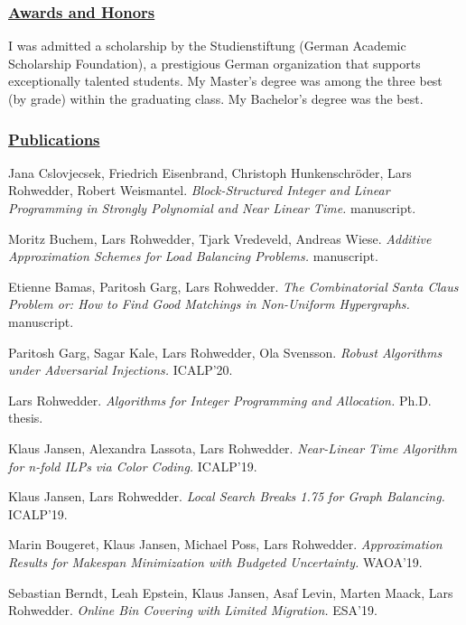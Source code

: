 \documentclass{article}
\begin{document}
  

  \subsubsection*{\underline{Awards and Honors}}
    I was admitted a scholarship by the Studienstiftung (German Academic Scholarship Foundation), a prestigious German organization that supports exceptionally talented students.
My Master's degree was among the three best (by grade) within the graduating class. My Bachelor's degree was the best.


  \subsubsection*{\underline{Publications}}
  
     \noindent
     Jana Cslovjecsek, Friedrich Eisenbrand, Christoph Hunkenschröder, Lars Rohwedder, Robert Weismantel. {\it Block-Structured Integer and Linear Programming in Strongly Polynomial and Near Linear Time.} manuscript. \medskip

  
     \noindent
     Moritz Buchem, Lars Rohwedder, Tjark Vredeveld, Andreas Wiese. {\it Additive Approximation Schemes for Load Balancing Problems.} manuscript. \medskip

  
     \noindent
     Etienne Bamas, Paritosh Garg, Lars Rohwedder. {\it The Combinatorial Santa Claus Problem or: How to Find Good Matchings in Non-Uniform Hypergraphs.} manuscript. \medskip

  
     \noindent
     Paritosh Garg, Sagar Kale, Lars Rohwedder, Ola Svensson. {\it Robust Algorithms under Adversarial Injections.} ICALP'20. \medskip

  
     \noindent
     Lars Rohwedder. {\it Algorithms for Integer Programming and Allocation.} Ph.D. thesis. \medskip

  
     \noindent
     Klaus Jansen, Alexandra Lassota, Lars Rohwedder. {\it Near-Linear Time Algorithm for n-fold ILPs via Color Coding.} ICALP'19. \medskip

  
     \noindent
     Klaus Jansen, Lars Rohwedder. {\it Local Search Breaks 1.75 for Graph Balancing.} ICALP'19. \medskip

  
     \noindent
     Marin Bougeret, Klaus Jansen, Michael Poss, Lars Rohwedder. {\it Approximation Results for Makespan Minimization with Budgeted Uncertainty.} WAOA'19. \medskip

  
     \noindent
     Sebastian Berndt, Leah Epstein, Klaus Jansen, Asaf Levin, Marten Maack, Lars Rohwedder. {\it Online Bin Covering with Limited Migration.} ESA'19. \medskip
\end{document}

